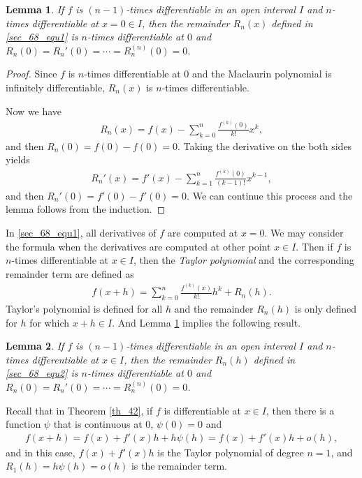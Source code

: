 \documentclass[10pt]{book}
\newtheorem{lemma}{Lemma}[chapter]
\theoremstyle{definition}
\numberwithin{equation}{chapter}
\begin{document}
\begin{lemma}\label{lemma_63}
If $f$ is $(n-1)$-times differentiable in an open interval $I$ and $n$-times differentiable at $x = 0 \in I$, then the remainder $R_n(x)$ defined in \eqref{sec_68_equ1} is $n$-times differentiable at $0$ and $R_n(0) = R_n'(0) = \cdots = R_n^{(n)}(0) = 0$.
\end{lemma}
\begin{proof}
Since $f$ is $n$-times differentiable at $0$ and the Maclaurin polynomial is infinitely differentiable, $R_n(x)$ is $n$-times differentiable. 

Now we have
\begin{align*}
    R_n(x) = f(x) - \sum^n_{k=0} \frac{f^{(k)}(0)}{k!} x^k,
\end{align*}
and then $R_n(0) = f(0) - f(0) = 0$. Taking the derivative on the both sides yields
\begin{align*}
    R_n'(x) = f'(x) - \sum^n_{k=1} \frac{f^{(k)}(0)}{(k-1)!} x^{k-1},
\end{align*}
and then $R_n'(0) = f'(0) - f'(0) = 0$. We can continue this process and the lemma follows from the induction.
\end{proof}

\medskip

In \eqref{sec_68_equ1}, all derivatives of $f$ are computed at $x = 0$. We may consider the formula when the derivatives are computed at other point $x \in I$. Then if $f$ is $n$-times differentiable at $x \in I$, then the {\em Taylor polynomial} and the corresponding remainder term are defined as
\begin{align}\label{sec_68_equ2}
    f(x + h) = \sum^n_{k=0} \frac{f^{(k)}(x)}{k!} h^k + R_n(h).
\end{align}
Taylor's polynomial is defined for all $h$ and the remainder $R_n(h)$ is only defined for $h$ for which $x + h \in I$. And Lemma \ref{lemma_63} implies the following result.

\medskip

\begin{lemma}\label{lemma_64}
If $f$ is $(n-1)$-times differentiable in an open interval $I$ and $n$-times differentiable at $x \in I$, then the remainder $R_n(h)$ defined in \eqref{sec_68_equ2} is $n$-times differentiable at $0$ and $R_n(0) = R_n'(0) = \cdots = R_n^{(n)}(0) = 0$.
\end{lemma}

\medskip

Recall that in Theorem \ref{th_42}, if $f$ is differentiable at $x \in I$, then there is a function $\psi$ that is continuous at $0$, $\psi(0) = 0$ and
\begin{align*}
    f(x + h) = f(x) + f'(x) h + h \psi(h) = f(x) + f'(x) h + o(h),
\end{align*}
and in this case, $f(x) + f'(x) h$ is the Taylor polynomial of degree $n = 1$, and $R_1(h) = h \psi(h) = o(h)$ is the remainder term.
\end{document}
